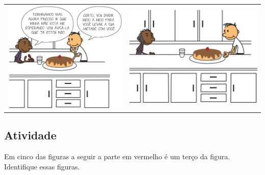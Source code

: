 \begin{refletindo*}[breakable]{}{}
  \noindent  \noindent\begin{tabular}{ll}
    \includegraphics[width=180pt, keepaspectratio]{..//media/cap1/secoes/pngs_licao_01/reflet_fig03.png}   & \includegraphics[width=200pt, keepaspectratio]{..//media/cap1/secoes/pngs_licao_01/reflet_fig04.png}  
  \end{tabular}
  
  

  
\end{refletindo*}


\subsection{Atividade}

Em cinco das figuras a seguir a parte em vermelho é um terço da figura. Identifique essas figuras.

